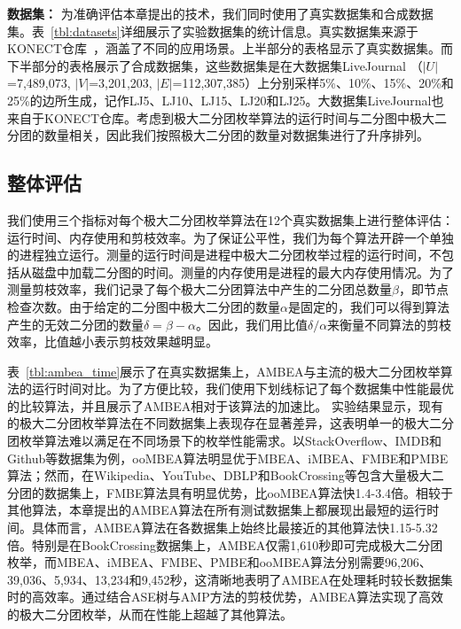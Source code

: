  

\textbf{数据集：} 为准确评估本章提出的技术，我们同时使用了真实数据集和合成数据集。表~\ref{tbl:datasets}详细展示了实验数据集的统计信息。真实数据集来源于KONECT仓库~\cite{konect}，涵盖了不同的应用场景。上半部分的表格显示了真实数据集。而下半部分的表格展示了合成数据集，这些数据集是在大数据集LiveJournal （$|U|$=7,489,073, $|V|$=3,201,203, $|E|$=112,307,385）上分别采样5\%、10\%、15\%、20\%和25\%的边所生成，记作LJ5、LJ10、LJ15、LJ20和LJ25。大数据集LiveJournal也来自于KONECT仓库。考虑到极大二分团枚举算法的运行时间与二分图中极大二分团的数量相关，因此我们按照极大二分团的数量对数据集进行了升序排列。

\subsection{整体评估}
\label{subsec:ambea_exp_overall}

我们使用三个指标对每个极大二分团枚举算法在12个真实数据集上进行整体评估：运行时间、内存使用和剪枝效率。为了保证公平性，我们为每个算法开辟一个单独的进程独立运行。测量的运行时间是进程中极大二分团枚举过程的运行时间，不包括从磁盘中加载二分图的时间。测量的内存使用是进程的最大内存使用情况。为了测量剪枝效率，我们记录了每个极大二分团算法中产生的二分团总数量$\beta$，即节点检查次数。由于给定的二分图中极大二分团的数量$\alpha$是固定的，我们可以得到算法产生的无效二分团的数量$\delta=\beta-\alpha$。因此，我们用比值$\delta/\alpha$来衡量不同算法的剪枝效率，比值越小表示剪枝效果越明显。




表~\ref{tbl:ambea_time}展示了在真实数据集上，AMBEA与主流的极大二分团枚举算法的运行时间对比。为了方便比较，我们使用下划线标记了每个数据集中性能最优的比较算法，并且展示了AMBEA相对于该算法的加速比。
实验结果显示，现有的极大二分团枚举算法在不同数据集上表现存在显著差异，这表明单一的极大二分团枚举算法难以满足在不同场景下的枚举性能需求。以StackOverflow、IMDB和Github等数据集为例，ooMBEA算法明显优于MBEA、iMBEA、FMBE和PMBE算法；然而，在Wikipedia、YouTube、DBLP和BookCrossing等包含大量极大二分团的数据集上，FMBE算法具有明显优势，比ooMBEA算法快1.4-3.4倍。相较于其他算法，本章提出的AMBEA算法在所有测试数据集上都展现出最短的运行时间。具体而言，AMBEA算法在各数据集上始终比最接近的其他算法快1.15-5.32倍。特别是在BookCrossing数据集上，AMBEA仅需1,610秒即可完成极大二分团枚举，而MBEA、iMBEA、FMBE、PMBE和ooMBEA算法分别需要96,206、39,036、5,934、13,234和9,452秒，这清晰地表明了AMBEA在处理耗时较长数据集时的高效率。通过结合ASE树与AMP方法的剪枝优势，AMBEA算法实现了高效的极大二分团枚举，从而在性能上超越了其他算法。


